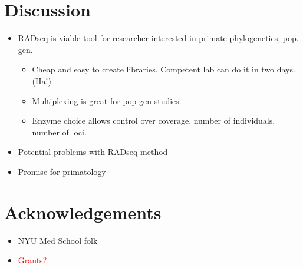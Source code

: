 \documentclass[12pt]{article}
\begin{document}
\section{Discussion}
\begin{itemize}
	\item RADseq is viable tool for researcher interested in primate phylogenetics, pop. gen.
	\begin{itemize}
		\item Cheap and easy to create libraries. Competent lab can do it in two days. (Ha!)
		\item Multiplexing is great for pop gen studies.
		\item Enzyme choice allows control over coverage, number of individuals, number of loci.
	\end{itemize}
	\item Potential problems with RADseq method
	\item Promise for primatology
\end{itemize}

\section{Acknowledgements}
\begin{itemize}
	\item NYU Med School folk
	\item \textcolor{red}{Grants?}
\end{itemize}
\end{document}
